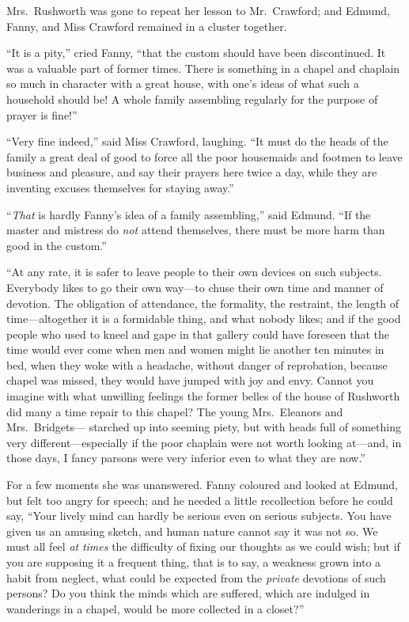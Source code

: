 \documentclass{article}
\begin{document}
Mrs.\ Rushworth was gone to repeat her lesson to Mr.\ Crawford;
and Edmund, Fanny, and Miss Crawford remained in a cluster
together.

``It is a pity,'' cried Fanny, ``that the custom should have
been discontinued.  It was a valuable part of former times.
There is something in a chapel and chaplain so much
in character with a great house, with one's ideas of what
such a household should be!  A whole family assembling
regularly for the purpose of prayer is fine!''

``Very fine indeed,'' said Miss Crawford, laughing.  ``It must
do the heads of the family a great deal of good to force
all the poor housemaids and footmen to leave business
and pleasure, and say their prayers here twice a day,
while they are inventing excuses themselves for staying
away.''

``\emph{That} is hardly Fanny's idea of a family assembling,''
said Edmund.  ``If the master and mistress do \emph{not}
attend themselves, there must be more harm than good
in the custom.''

``At any rate, it is safer to leave people to their own
devices on such subjects.  Everybody likes to go their
own way---to chuse their own time and manner of devotion.
The obligation of attendance, the formality, the restraint,
the length of time---altogether it is a formidable thing,
and what nobody likes; and if the good people who used
to kneel and gape in that gallery could have foreseen
that the time would ever come when men and women might lie
another ten minutes in bed, when they woke with a headache,
without danger of reprobation, because chapel was missed,
they would have jumped with joy and envy.  Cannot you
imagine with what unwilling feelings the former belles
of the house of Rushworth did many a time repair to
this chapel?  The young Mrs.\ Eleanors and Mrs.\ Bridgets---%
starched up into seeming piety, but with heads full
of something very different---especially if the poor
chaplain were not worth looking at---and, in those days,
I fancy parsons were very inferior even to what they
are now.''

For a few moments she was unanswered.  Fanny coloured
and looked at Edmund, but felt too angry for speech;
and he needed a little recollection before he could say,
``Your lively mind can hardly be serious even on serious subjects.
You have given us an amusing sketch, and human nature
cannot say it was not so.  We must all feel \emph{at} \emph{times}
the difficulty of fixing our thoughts as we could wish;
but if you are supposing it a frequent thing, that is to say,
a weakness grown into a habit from neglect, what could
be expected from the \emph{private} devotions of such persons?
Do you think the minds which are suffered, which are
indulged in wanderings in a chapel, would be more collected
in a closet?''
\end{document}
